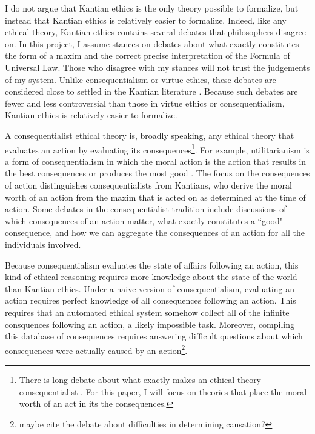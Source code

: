 \begin{isabellebody}
\begin{isamarkuptext}
I do not argue that Kantian ethics is the only theory possible to formalize, but instead that Kantian
ethics is relatively easier to formalize. Indeed, like any ethical theory, Kantian ethics contains 
several debates that philosophers disagree on. In this project, I assume stances on debates about
what exactly constitutes the form of a maxim and the correct precise interpretation of the Formula of 
Universal Law. Those who disagree with my stances will not trust the judgements of my system. Unlike
consequentialism or virtue ethics, these debates are considered close to settled in the Kantian literature 
\cite{ebelsduggan}. Because such debates are fewer and less controversial than those in virtue ethics
or consequentialism, Kantian ethics is relatively easier to formalize.%
\end{isamarkuptext}\isamarkuptrue%
%
\isadelimdocument
%
\endisadelimdocument
%
\isatagdocument
%
\isamarkuptrue%
%
\endisatagdocument
{\isafolddocument}%
%
\isadelimdocument
%
\endisadelimdocument
%
\begin{isamarkuptext}%
A consequentialist ethical theory is, broadly speaking, any ethical theory that evaluates an action by evaluating 
its consequences\footnote{There is long debate about what exactly makes an ethical theory consequentialist \cite{consequentialismsep}. 
For this paper, I will focus on theories that place the moral worth of an act in its the consequences.}. For example, 
utilitarianism is a form of consequentialism in which the moral action 
is the action that results in the best consequences or produces the most good \cite{utilsep}. The focus
on the consequences of action distinguishes consequentialists from Kantians, who derive the moral worth
of an action from the maxim that is acted on as determined at the time of action. Some debates
in the consequentialist tradition include discussions of which consequences of an action matter,
what exactly constitutes a ``good" consequence, and how we can aggregate the consequences of an action
for all the individuals involved.%
\end{isamarkuptext}\isamarkuptrue%
%
\isadelimdocument
%
\endisadelimdocument
%
\isatagdocument
%
\isamarkuptrue%
%
\endisatagdocument
{\isafolddocument}%
%
\isadelimdocument
%
\endisadelimdocument
%
\begin{isamarkuptext}%
Because consequentialism evaluates the state of affairs following an action, this kind of ethical 
reasoning requires more knowledge
about the state of the world than Kantian ethics. Under a naive version of consequentialism, evaluating 
an action requires perfect knowledge of all consequences following an action. This requires that an 
automated ethical system somehow collect all of the infinite consquences following an action, a likely
impossible task. Moreover, compiling this database of consequences requires 
answering difficult questions about which consequences were actually caused by an action\footnote
{maybe cite the debate about difficulties in determining causation?}.


\end{isamarkuptext}
\end{isabellebody}
